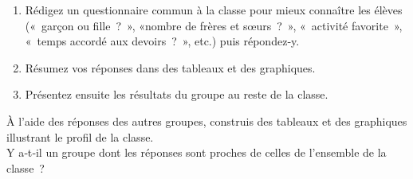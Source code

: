 
\begin{TP}[Enquête]


\begin{enumerate}
 \item Rédigez un questionnaire commun à la classe pour mieux connaître les élèves (« garçon ou fille ? », «nombre de frères et sœurs ? », « activité favorite », « temps accordé aux devoirs ? », etc.) puis répondez‑y.
 \item Résumez vos réponses dans des tableaux et des graphiques.
 \item Présentez ensuite les résultats du groupe au reste de la classe.
 \end{enumerate}
 

À l'aide des réponses des autres groupes, construis des tableaux et des graphiques illustrant le profil de la classe. \\[1em]
Y a‑t‑il un groupe dont les réponses sont proches de celles de l'ensemble de la classe ?
\end{TP}

